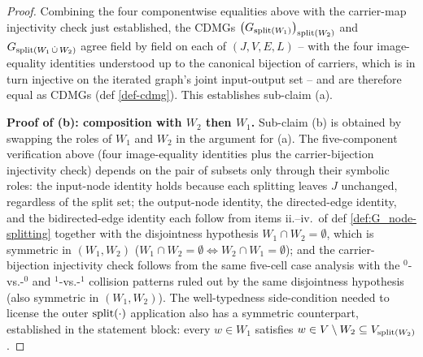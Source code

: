 \documentclass[main]{subfiles}
\begin{document}
\begin{proof}
\smallskip
Combining the four componentwise equalities above with the carrier-map injectivity check just established, the CDMGs $\left ( G_{\mathrm{split}(W_1)} \right )_{\mathrm{split}(W_2)}$ and $G_{\mathrm{split}(W_1 \,\dot{\cup}\, W_2)}$ agree field by field on each of $(J, V, E, L)$ -- with the four image-equality identities understood up to the canonical bijection of carriers, which is in turn injective on the iterated graph's joint input-output set -- and are therefore equal as CDMGs (def \ref{def-cdmg}). This establishes sub-claim (a).

\medskip\noindent\textbf{Proof of (b): composition with $W_2$ then $W_1$.}
Sub-claim (b) is obtained by swapping the roles of $W_1$ and $W_2$ in the argument for (a). The five-component verification above (four image-equality identities plus the carrier-bijection injectivity check) depends on the pair of subsets only through their symbolic roles: the input-node identity holds because each splitting leaves $J$ unchanged, regardless of the split set; the output-node identity, the directed-edge identity, and the bidirected-edge identity each follow from items ii.--iv.\ of def \ref{def:G_node-splitting} together with the disjointness hypothesis $W_1 \cap W_2 = \emptyset$, which is symmetric in $(W_1, W_2)$ ($W_1 \cap W_2 = \emptyset \Leftrightarrow W_2 \cap W_1 = \emptyset$); and the carrier-bijection injectivity check follows from the same five-cell case analysis with the $^0$-vs.-$^0$ and $^1$-vs.-$^1$ collision patterns ruled out by the same disjointness hypothesis (also symmetric in $(W_1, W_2)$). The well-typedness side-condition needed to license the outer $\mathrm{split}(\cdot)$ application also has a symmetric counterpart, established in the statement block: every $w \in W_1$ satisfies $w \in V \setminus W_2 \subseteq V_{\mathrm{split}(W_2)}$.


\end{proof}
\end{document}
